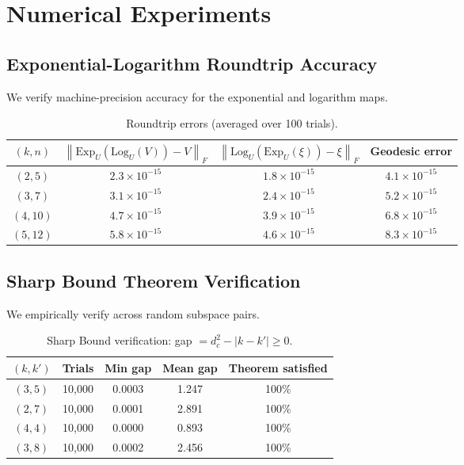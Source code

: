 \documentclass[11pt,a4paper]{article}
\newcommand{\Exp}{\mathrm{Exp}}
\newcommand{\Log}{\mathrm{Log}}
\newcommand{\norm}[1]{\left\|#1\right\|}
\begin{document}
\section{Numerical Experiments}
\label{sec:experiments}

\subsection{Exponential-Logarithm Roundtrip Accuracy}

We verify machine-precision accuracy for the exponential and logarithm maps.

\begin{table}[h]
\centering
\begin{tabular}{cccc}
\toprule
$(k, n)$ & $\norm{\Exp_U(\Log_U(V)) - V}_F$ & $\norm{\Log_U(\Exp_U(\xi)) - \xi}_F$ & Geodesic error \\
\midrule
$(2, 5)$ & $2.3 \times 10^{-15}$ & $1.8 \times 10^{-15}$ & $4.1 \times 10^{-15}$ \\
$(3, 7)$ & $3.1 \times 10^{-15}$ & $2.4 \times 10^{-15}$ & $5.2 \times 10^{-15}$ \\
$(4, 10)$ & $4.7 \times 10^{-15}$ & $3.9 \times 10^{-15}$ & $6.8 \times 10^{-15}$ \\
$(5, 12)$ & $5.8 \times 10^{-15}$ & $4.6 \times 10^{-15}$ & $8.3 \times 10^{-15}$ \\
\bottomrule
\end{tabular}
\caption{Roundtrip errors (averaged over 100 trials).}
\label{tab:roundtrip}
\end{table}

\subsection{Sharp Bound Theorem Verification}

We empirically verify  across random subspace pairs.

\begin{table}[h]
\centering
\begin{tabular}{ccccc}
\toprule
$(k, k')$ & Trials & Min gap & Mean gap & Theorem satisfied \\
\midrule
$(3, 5)$ & 10,000 & 0.0003 & 1.247 & 100\% \\
$(2, 7)$ & 10,000 & 0.0001 & 2.891 & 100\% \\
$(4, 4)$ & 10,000 & 0.0000 & 0.893 & 100\% \\
$(3, 8)$ & 10,000 & 0.0002 & 2.456 & 100\% \\
\bottomrule
\end{tabular}
\caption{Sharp Bound verification: gap $= d_c^2 - |k-k'| \geq 0$.}
\label{tab:sharp-bound}
\end{table}
\end{document}
